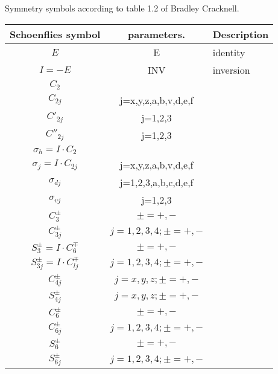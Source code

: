 \documentclass[11pt,a4paper]{report}
\begin{document}
Symmetry symbols according to table 1.2 of Bradley Cracknell.
\begin{center}
\begin{tabular}{|c|c|l|}
\hline
Schoenflies symbol & parameters. & Description\\
\hline
$E$       & E    & identity   \\
$I=-E$    & INV  & inversion  \\
\hline
$C_{2}$   & & \\
$C_{2j}$  & j=x,y,z,a,b,v,d,e,f& \\
$C'_{2j}$ & j=1,2,3 &\\
$C''_{2j}$ & j=1,2,3 &\\
\hline
$\sigma_{h}=I\cdot C_2$ & & \\
$\sigma_{j}=I\cdot C_{2j}$ & j=x,y,z,a,b,v,d,e,f& \\
$\sigma_{dj}$ & j=1,2,3,a,b,c,d,e,f& \\
$\sigma_{vj}$  & j=1,2,3& \\
\hline
$C_3^\pm$ & $\pm=+,-$ & \\
$C_{3j}^\pm$ & $j=1,2,3,4; \pm=+,-$ & \\
\hline
$S_3^\pm=I\cdot C_6^\mp$ & $\pm=+,-$ \\
$S_{3j}^\pm=I\cdot C_{lj}^\mp$   & $j=1,2,3,4; \pm=+,-$ & \\
\hline
$C_{4j}^\pm$ & $j=x,y,z; \pm=+,-$ & \\
$S_{4j}^\pm$ & $j=x,y,z; \pm=+,-$ & \\
\hline
$C_6^\pm$ & $\pm=+,-$ & \\
$C_{6j}^\pm$ & $j=1,2,3,4; \pm=+,-$ &\\
\hline
$S_6^\pm$ & $\pm=+,-$ & \\
$S_{6j}^\pm$ & $j=1,2,3,4; \pm=+,-$ & \\
\hline
\end{tabular}
\end{center}
\end{document}
